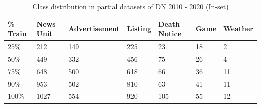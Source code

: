 \documentclass[oneside, english, bibtex]{kththesis}
\begin{document}
\begin{table}[!htp]
\begin{center}
    \caption{Class distribution in partial datasets of DN 2010 - 2020 (In-set)}
    \label{tab:partialdist}
    \begin{tabular}{l|l|l|l|l|l|l} %
    \textbf{\% Train} & \textbf{News Unit} & \textbf{Advertisement} & \textbf{Listing} & \textbf{Death Notice} & \textbf{Game} & \textbf{Weather}  \\
    \hline
    25\% & 212 & 149 & 225 & 23 & 18 & 2 \\    \hline
    50\% & 449 & 332 & 456 & 75 & 26 & 4 \\    \hline
    75\% & 648 & 500 & 618 & 66 & 36 & 11 \\    \hline
    90\% & 953 & 502 & 810 & 63 & 41 & 11 \\    \hline
    100\% & 1027 & 554 & 920 & 105 & 55 & 12 \\    \hline
    \end{tabular}
\end{center}
\end{table}







\end{document}
